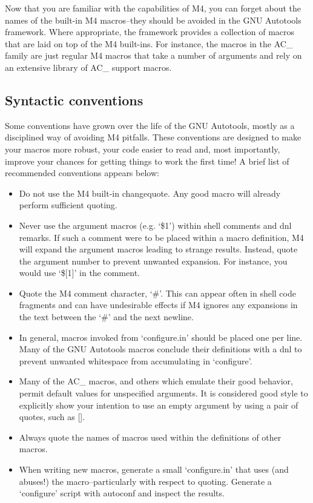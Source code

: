 Now that you are familiar with the capabilities of M4, you can forget about the names of the built-in M4 macros--they should be avoided in the GNU Autotools framework. Where appropriate, the framework provides a collection of macros that are laid on top of the M4 built-ins. For instance, the macros in the AC\_{} family are just regular M4 macros that take a number of arguments and rely on an extensive library of AC\_{} support macros. 

\subsection{Syntactic conventions}

Some conventions have grown over the life of the GNU Autotools, mostly as a disciplined way of avoiding M4 pitfalls. These conventions are designed to make your macros more robust, your code easier to read and, most importantly, improve your chances for getting things to work the first time! A brief list of recommended conventions appears below: 


\begin{itemize}
\item Do not use the M4 built-in changequote. Any good macro will already perform sufficient quoting.

\item Never use the argument macros (e.g. `\$1') within shell comments and dnl remarks. If such a comment were to be placed within a macro definition, M4 will expand the argument macros leading to strange results. Instead, quote the argument number to prevent unwanted expansion. For instance, you would use `\$[1]' in the comment.

\item Quote the M4 comment character, `\#'. This can appear often in shell code fragments and can have undesirable effects if M4 ignores any expansions in the text between the `\#' and the next newline.

\item In general, macros invoked from `configure.in' should be placed one per line. Many of the GNU Autotools macros conclude their definitions with a dnl to prevent unwanted whitespace from accumulating in `configure'.

\item Many of the AC\_{} macros, and others which emulate their good behavior, permit default values for unspecified arguments. It is considered good style to explicitly show your intention to use an empty argument by using a pair of quotes, such as [].

\item Always quote the names of macros used within the definitions of other macros.

\item When writing new macros, generate a small `configure.in' that uses (and abuses!) the macro--particularly with respect to quoting. Generate a `configure' script with autoconf and inspect the results.
\end{itemize}

